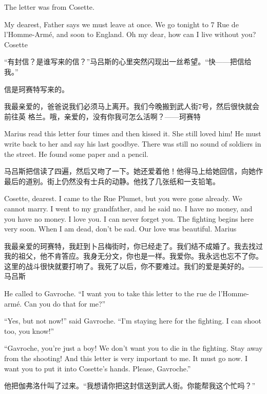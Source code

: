 \documentclass[fontset=ubuntu, zihao=5]{ctexart}
\begin{document}
\begin{paracol}{2}
The letter was from Cosette.

My dearest, Father says we must leave at once. We go tonight to 7 Rue de l'Homme-Armé, and soon to England. Oh my dear, how can I live without you? Cosette

\switchcolumn

“有封信？是谁写来的信？”马吕斯的心里突然闪现出一丝希望。“快——把信给我。”

信是珂赛特写来的。

我最亲爱的，爸爸说我们必须马上离开。我们今晚搬到武人街7号，然后很快就会前往英
格兰。哦，亲爱的，没有你我可怎么活啊？——珂赛特

\switchcolumn*

Marius read this letter four times and then kissed it. She still loved him! He must write back to her and say his last goodbye. There was still no sound of soldiers in the street. He found some paper and a pencil.

\switchcolumn

马吕斯把信读了四遍，然后又吻了一下。她还爱着他！他得马上给她回信，向她作最后的道别。街上仍然没有士兵的动静。他找了几张纸和一支铅笔。

\switchcolumn*

Cosette, dearest. I came to the Rue Plumet, but you were gone already. We cannot marry. I went to my grandfather, and he said no. I have no money, and you have no money. I love you. I can never forget you. The fighting begins here very soon. When I am dead, don't be sad. Our love was beautiful. Marius

\switchcolumn

我最亲爱的珂赛特，我赶到卜吕梅街时，你已经走了。我们结不成婚了。我去找过我的祖父，他不肯答应。我身无分文，你也是一样。我爱你。我永远也忘不了你。这里的战斗很快就要打响了。我死了以后，你不要难过。我们的爱是美好的。——马吕斯

\switchcolumn*

He called to Gavroche. ``I want you to take this letter to the rue de l'Homme-armé. Can you do that for me?''

``Yes, but not now!'' said Gavroche. ``I'm staying here for the fighting. I can shoot too, you know!''

``Gavroche, you're just a boy! We don't want you to die in the fighting. Stay
away from the shooting! And this letter is very important to me. It must go
now. I want you to put it into Cosette's hands. Please, Gavroche.''

\switchcolumn

他把伽弗洛什叫了过来。“我想请你把这封信送到武人街。你能帮我这个忙吗？”


\end{paracol}
\end{document}
